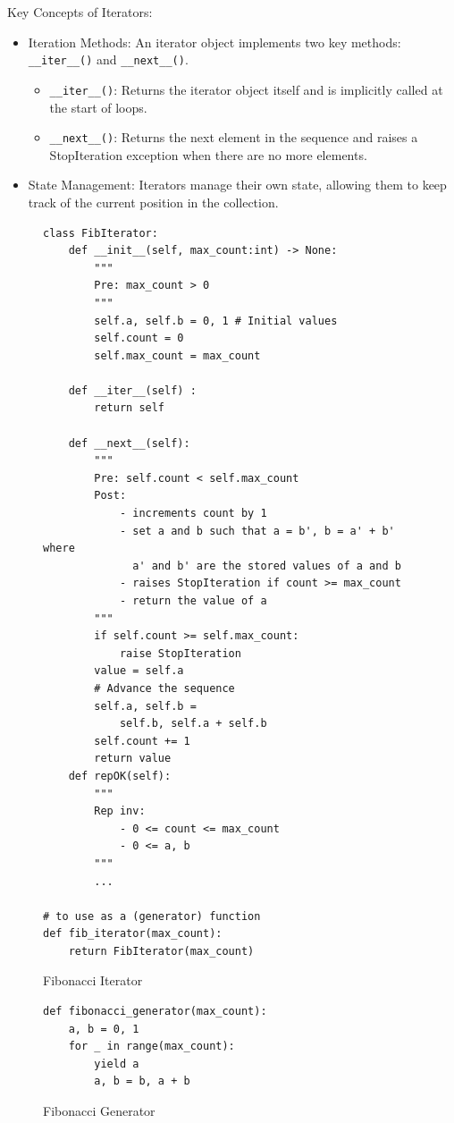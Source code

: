 \documentclass[oneside,11pt,dvipsnames]{book}
\newcommand{\code}[1]{\texttt{#1}}
\begin{document}
Key Concepts of Iterators:
\begin{itemize}
\item Iteration Methods: An iterator object implements two key methods: \code{\_\_iter\_\_()} and \code{\_\_next\_\_()}.
\begin{itemize}
    \item \code{\_\_iter\_\_()}: Returns the iterator object itself and is implicitly called at the start of loops.
	\item \code{\_\_next\_\_()}: Returns the next element in the sequence and raises a StopIteration exception when there are no more elements.
\end{itemize}
\item State Management: Iterators manage their own state, allowing them to keep track of the current position in the collection.
\end{itemize}

\begin{figure}
\begin{lstlisting}
class FibIterator:
    def __init__(self, max_count:int) -> None:
        """
        Pre: max_count > 0
        """
        self.a, self.b = 0, 1 # Initial values
        self.count = 0
        self.max_count = max_count

    def __iter__(self) :
        return self

    def __next__(self):
        """
        Pre: self.count < self.max_count
        Post:
            - increments count by 1
            - set a and b such that a = b', b = a' + b' where 
              a' and b' are the stored values of a and b
            - raises StopIteration if count >= max_count
            - return the value of a
        """    
        if self.count >= self.max_count:
            raise StopIteration
        value = self.a
        # Advance the sequence
        self.a, self.b = 
            self.b, self.a + self.b  
        self.count += 1
        return value
    def repOK(self):
        """
        Rep inv:
            - 0 <= count <= max_count
            - 0 <= a, b
        """
        ...

# to use as a (generator) function        
def fib_iterator(max_count):
    return FibIterator(max_count)
\end{lstlisting}
\caption{Fibonacci Iterator}\label{fig:fib-iterator}
\end{figure}

\begin{figure}
\begin{minipage}{0.50\textwidth}
    \begin{lstlisting}
def fibonacci_generator(max_count):
    a, b = 0, 1
    for _ in range(max_count):
        yield a
        a, b = b, a + b        
    \end{lstlisting}
    \caption{Fibonacci Generator}\label{fig:fib-generator}
\end{minipage}    
\end{figure}
\end{document}

